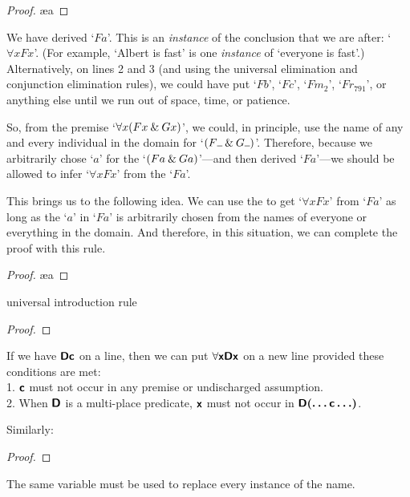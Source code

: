 \begin{proof}
	 \pr{}
	 
	 \ae{a}
\end{proof}
We have derived `$Fa$'. This is an \textit{instance} of the conclusion that we are after: `$\forall xFx$'. (For example, `Albert is fast' is one \textit{instance} of `everyone is fast'.) 
Alternatively, on lines 2 and 3 (and using the universal elimination and conjunction elimination rules), we could have put `$Fb$', `$Fc$', `$Fm_2$', `$Fr_{791}$', or anything else until we run out of space, time, or patience.   

So, from the premise `$\forall x (Fx \mathbin{\&} Gx)$', we could, in principle, use the name of any and every individual in the domain for `$(F\rule{1.7mm}{0.15mm} \eand G\rule{1.7mm}{0.15mm})$'.
Therefore, because we arbitrarily chose `$a$' for the `$(Fa \mathbin{\&} Ga)$'---and then derived `$Fa$'---we should be allowed to infer `$\forall x Fx$' from the `$Fa$'.  

This brings us to the following idea. We can use the  to get `$\forall x Fx$' from `$Fa$' as long as the `$a$' in `$Fa$' is arbitrarily chosen from the names of everyone or everything in the domain. And therefore, in this situation, we can complete the proof with this rule.

\begin{proof}
	 \pr{}
	 
	 \ae{a}
	 
\end{proof}

\begin{factboxy}{universal introduction rule}
\begin{proof}
	 
\end{proof}

\small{If we have $\bm{\mathsf{Dc}}$ on a line, then we can put $\forall \bm{\mathsf{xDx}}$ on a new line provided these conditions are met:\\
1. $\bm{\mathsf{c}}$ must not occur in any premise or undischarged assumption.\\
2. When $\bm{\mathsf{D}}$ is a multi-place predicate, $\bm{\mathsf{x}}$ must not occur in $\bm{\mathsf{D(\ldots c\ldots)}}$.
\smallskip

Similarly:}

\begin{proof}
	 
\end{proof}

\small{The same variable must be used to replace every instance of the name.}
\end{factboxy}

